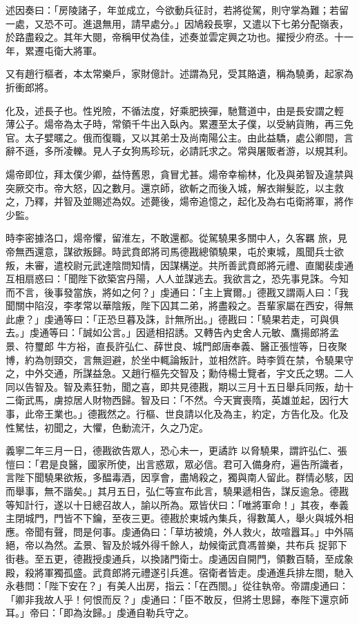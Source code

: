 \begin{pinyinscope}
 述因奏曰：「房陵諸子，年並成立，今欲動兵征討，若將從駕，則守掌為難；若留一處，又恐不可。進退無用，請早處分。」因鳩殺長寧，又遣以下七弟分配嶺表，於路盡殺之。其年大閱，帝稱甲仗為佳，述奏並雲定興之功也。擢授少府丞。十一年，累遷屯衛大將軍。



 又有趙行樞者，本太常樂戶，家財億計。述謂為兒，受其賂遺，稱為驍勇，起家為折衝郎將。



 化及，述長子也。性兇險，不循法度，好乘肥挾彈，馳鶩道中，由是長安謂之輕
 薄公子。煬帝為太子時，常領千牛出入臥內。累遷至太子僕，以受納貨賄，再三免官。太子嬖暱之。俄而復職，又以其弟士及尚南陽公主。由此益驕，處公卿間，言辭不遜，多所凌轢。見人子女狗馬珍玩，必請託求之。常與屠販者游，以規其利。



 煬帝即位，拜太僕少卿，益恃舊恩，貪冒尤甚。煬帝幸榆林，化及與弟智及違禁與突厥交市。帝大怒，囚之數月。還京師，欲斬之而後入城，解衣辮髮訖，以主救之，乃釋，并智及並賜述為奴。述薨後，煬帝追憶之，起化及為右屯衛將軍，將作少監。



 時李密據洛口，煬帝懼，留淮左，不敢還都。從駕驍果多關中人，久客羈
 旅，見帝無西還意，謀欲叛歸。時武賁郎將司馬德戡總領驍果，屯於東城，風聞兵士欲叛，未審，遣校尉元武達陰問知情，因謀構逆。共所善武賁郎將元禮、直閣裴虔通互相扇惑曰：「聞陛下欲築宮丹陽，人人並謀逃去。我欲言之，恐先事見誅。今知而不言，後事發當族，將如之何？」虔通曰：「主上實爾。」德戡又謂兩人曰：「我聞關中陷沒，李孝常以華陰叛，陛下囚其二弟，將盡殺之。吾輩家屬在西安，得無此慮？」虔通等曰：「正恐旦暮及誅，計無所出。」德戡曰：「驍果若走，可與俱去。」虔通等曰：「誠如公言。」因遞相招誘。又轉告內史舍人元敏、鷹揚郎將孟景、符璽郎
 牛方裕，直長許弘仁、薛世良、城門郎唐奉義、醫正張愷等，日夜聚博，約為刎頸交，言無迴避，於坐中輒論叛計，並相然許。時李質在禁，令驍果守之，中外交通，所謀益急。又趙行樞先交智及；勳侍楊士覽者，宇文氏之甥。二人同以告智及。智及素狂勃，聞之喜，即共見德戡，期以三月十五日舉兵同叛，劫十二衛武馬，虜掠居人財物西歸。智及曰：「不然。今天實喪隋，英雄並起，因行大事，此帝王業也。」德戡然之。行樞、世良請以化及為主，約定，方告化及。化及性駑怯，初聞之，大懼，色動流汗，久之乃定。



 義寧二年三月一日，德戡欲告眾人，恐心未一，更譎詐
 以脅驍果，謂許弘仁、張愷曰：「君是良醫，國家所使，出言惑眾，眾必信。君可入備身府，遍告所識者，言陛下聞驍果欲叛，多醖毒酒，因享會，盡鳩殺之，獨與南人留此。群情必駭，因而舉事，無不諧矣。」其月五日，弘仁等宣布此言，驍果遞相告，謀反逾急。德戡等知計行，遂以十日總召故人，諭以所為。眾皆伏曰：「唯將軍命！」其夜，奉義主閉城門，門皆不下鑰，至夜三更。德戡於東城內集兵，得數萬人，舉火與城外相應。帝聞有聲，問是何事。虔通偽曰：「草坊被燒，外人救火，故喧囂耳。」中外隔絕，帝以為然。孟景、智及於城外得千餘人，劫候衛武賁馮普樂，共布兵
 捉郭下街巷。至五更，德戡授虔通兵，以換諸門衛士。虔通因自開門，領數百騎，至成象殿，殺將軍獨孤盛。武賁郎將元禮遂引兵進。宿衛者皆走。虔通進兵排左閤，馳入永巷問：「陛下安在？」有美人出房，指云：「在西閤。」從往執帝。帝謂虔通曰：「卿非我故人乎！何恨而反？」虔通曰：「臣不敢反，但將士思歸，奉陛下還京師耳。」帝曰：「即為汝歸。」虔通自勒兵守之。




\end{pinyinscope}

